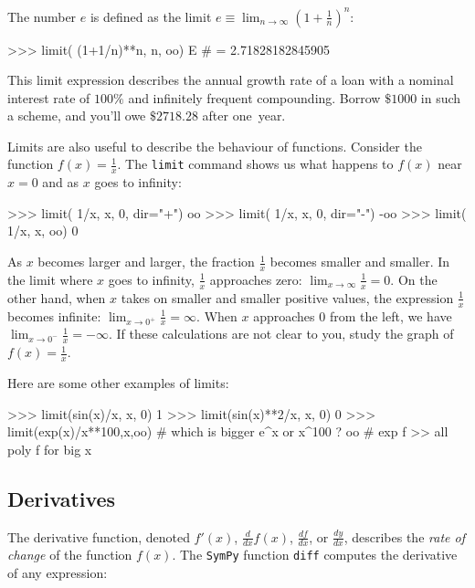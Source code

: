 The number $e$ is defined as the limit
$\displaystyle e \equiv \lim_{n\to \infty} \left( 1 + \frac{1}{n}\right)^{n}$:
\small
\begin{verbatimtab}
>>> limit( (1+1/n)**n, n, oo)
E          # = 2.71828182845905
\end{verbatimtab}
\normalsize

\noindent
This limit expression describes the annual growth rate of a loan
with a nominal interest rate of $100\%$ and infinitely frequent compounding.							
Borrow $\$1000$ in such a scheme,
and you'll owe $\$2718.28$ after one~year.

Limits are also useful to describe the behaviour of functions.
Consider the function $f(x)=\frac{1}{x}$.
The \texttt{limit} command shows us what happens to $f(x)$ near $x=0$ and as $x$ goes to infinity:

\small
\begin{verbatimtab}
>>> limit( 1/x, x, 0, dir="+")
oo
>>> limit( 1/x, x, 0, dir="-")
-oo
>>> limit( 1/x, x, oo)
0
\end{verbatimtab}
\normalsize

\noindent
As $x$ becomes larger and larger, the fraction $\frac{1}{x}$ becomes smaller and smaller.
In the limit where $x$ goes to infinity, $\frac{1}{x}$ approaches zero: $\lim_{x\to \infty} \frac{1}{x} = 0$. 
On the other hand, when $x$ takes on smaller and smaller positive values,
the expression $\frac{1}{x}$ becomes infinite: $\lim_{x \to 0^+} \frac{1}{x} = \infty$.
When $x$ approaches $0$ from the left, we have $\lim_{x \to 0^-} \frac{1}{x} = -\infty$.
If these calculations are not clear to you,
study the graph of $f(x)=\frac{1}{x}$.


Here are some other examples of limits:

\small
\begin{verbatimtab}
>>> limit(sin(x)/x, x, 0)
1
>>> limit(sin(x)**2/x, x, 0)
0
>>> limit(exp(x)/x**100,x,oo) # which is bigger e^x or x^100 ?
oo                            # exp f >> all poly f for big x  
\end{verbatimtab}
\normalsize


\subsection{Derivatives}
\label{calculus:derivatives}
The derivative function, denoted $f'(x)$, $\frac{d}{dx}f(x)$, $\frac{df}{dx}$, or $\frac{dy}{dx}$, 								
describes the \emph{rate of change} of the function $f(x)$.
The \texttt{SymPy} function \texttt{diff} computes the derivative of any expression:



